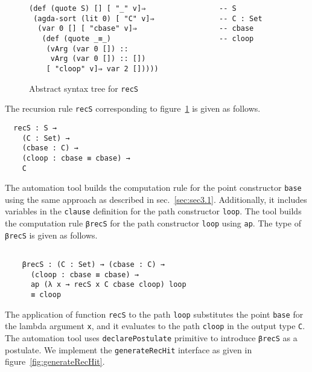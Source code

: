 \documentclass[sigplan,10pt]{acmart}
\begin{document}
\begin{figure}
\begin{center}
\begingroup
\fontsize{7pt}{9pt}\selectfont
\begin{Verbatim}
(def (quote S) [] [ "_" v]⇒                 -- S
 (agda-sort (lit 0) [ "C" v]⇒               -- C : Set
  (var 0 [] [ "cbase" v]⇒                   -- cbase
   (def (quote _≡_)                         -- cloop
    (vArg (var 0 []) ::
     vArg (var 0 []) :: [])
    [ "cloop" v]⇒ var 2 []))))
\end{Verbatim}
\endgroup
\end{center}
\caption{Abstract syntax tree for {\tt recS}}
\label{fig:ast-f}
\end{figure}
\normalsize

The recursion rule {\tt recS} corresponding to figure~\ref{fig:ast-f} is given as follows.
\begin{center}
\begingroup
\begin{BVerbatim}
  recS : S → 
    (C : Set) →
    (cbase : C) →
    (cloop : cbase ≡ cbase) →
    C
\end{BVerbatim}
\endgroup
\end{center}

The automation tool builds the computation rule for the point constructor {\tt base} using the same approach as described in sec.~\ref{sec:sec3.1}. Additionally, it includes variables in the {\tt clause} definition for the path constructor {\tt loop}. The tool builds the computation rule {\tt βrecS} for the path constructor {\tt loop} using {\tt ap}. The type of {\tt βrecS} is given as follows.

\begin{center}
\begingroup
\begin{BVerbatim}

    βrecS : (C : Set) → (cbase : C) → 
      (cloop : cbase ≡ cbase) → 
      ap (λ x → recS x C cbase cloop) loop 
      ≡ cloop
\end{BVerbatim}
\endgroup
\end{center}

The application of function {\tt recS} to the path {\tt loop} substitutes the point {\tt base} for the lambda argument {\tt x}, and it evaluates to the path {\tt cloop} in the output type {\tt C}. The automation tool uses {\tt declarePostulate} primitive to introduce {\tt βrecS} as a postulate. We implement the {\tt generateRecHit} interface as given in figure~\ref{fig:generateRecHit}.
\end{document}
